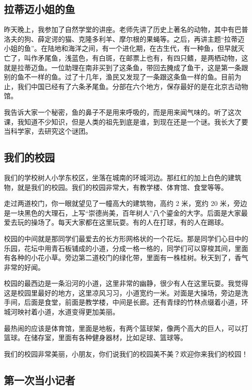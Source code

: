 \documentclass[UTF8,a4paper,titlepage,twoside,10.5pt]{article}
\begin{document}
\subsection{拉蒂迈小姐的鱼}
\label{sec:org919ae68}

昨天晚上，我参加了自然学堂的讲座。老师先讲了历史上著名的动物，其中有巴普洛夫的狗、薛定谔的猫、克隆多利羊、摩尔根的果蝇等。之后，再讲主题“拉蒂迈小姐的鱼”。在陆地和海洋之间，有一个进化期，在古生代，有一种鱼，但早就灭亡了，叫作矛尾鱼，浅蓝色，有白斑，在邮票上也有，有四只鳍，是两栖动物，这就是拉蒂迈鱼。一位助理在南非买到了这条鱼，带回去腌成了鱼干，这是第一条跟别的鱼不一样的鱼。过了十几年，渔民又发现了一条跟这条鱼一样的鱼。目前为止，我们中国已经有了六条矛尾鱼。分部在六个地方，保存最好的是在北京古动物馆。

我告诉大家一个秘密，鱼的鼻子不是用来呼吸的，而是用来闻气味的。听了这次课，我知道不少知识，但是人类的祖先到底是谁，到现在还是一个谜。我长大了要当科学家，去研究这个谜团。

\subsection{我们的校园}
\label{sec:orgb5d5908}

我们的学校树人小学东校区，坐落在城南的环城河边。那红红的加上白色的建筑物，就是我们的校园。我们的校园非常大，有教学楼、体育馆、食堂等等。

走过两道校门，你一眼就望见了一幢高大的建筑物，高约 2 米，宽约 20 米，旁边是一块黑色的大理石，上写“崇德尚美，百年树人”八个鎏金的大字。后面是大家最爱去玩的操场了。每天大家都在这里玩耍。有的人在打球，有的人在踢球。

校园的中间就是那同学们最爱去的长方形网格状的一个花坛。那是同学们心目中的乐园，花坛中用青石板铺成的小道，分成一格一格的，同学们可以穿梭其间，里面有各种的小花小草。旁边第二道校门的绿化带，里面有一株桂树。秋天到了，香气非常的好闻。

校园的最西边是一条沿河的小道，这里非常的幽静，很少有人在这里玩耍。我觉得这是校园里最好的地方，这里凉风习习，小道宽约一米。对面是大操场，旁边是洗手间，后面是食堂，前面是教学楼，中间是长廊。还有青绿的竹林点缀着小道，环城河映衬着小道，水道变得更加美丽。

最热闹的应该是体育馆，里面是地板，有两个篮球架，像两个高大的巨人，可以打篮球。在储存室，里面有各种健身器材，比如足球、篮球等。

我们的校园非常美丽，小朋友，你们说我们的校园美不美？欢迎你来我们的校园！

\subsection{第一次当小记者}
\label{sec:orgf8eca1b}
\end{document}
